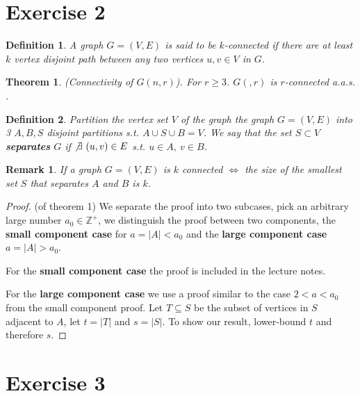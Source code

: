 \documentclass[11pt]{article}
\newtheorem{theorem}{Theorem}
\newtheorem{definition}{Definition}
\newtheorem{remark}{Remark}
\begin{document}
\newpage

\section*{Exercise 2} 

\begin{definition}
    A graph $G=(V,E)$ is said to be $k$-connected if there are at least $k$ vertex disjoint path between any two vertices $u,v\in V$ in $G$.
\end{definition}

\begin{theorem}
    (Connectivity of $G(n,r)$). For $r\geq 3$. $G(,r)$ is $r$-connected a.a.s. .
\end{theorem}

\begin{definition}
    Partition the vertex set $V$ of the graph the graph $G=(V,E)$ into 3 $A,B,S$ disjoint partitions s.t. $A\cup S \cup B=V$. We say that the set $S\subset V$ \textbf{separates} $G$ if $\not \exists ~ (u,v) \in E$ s.t. $u\in A,~v\in B$. 
\end{definition}

\begin{remark}
    If a graph $G=(V,E)$ is $k$ connected $\iff$ the size of the smallest set $S$ that separates $A$ and $B$ is $k$.
\end{remark}

\begin{proof} (of theorem 1)
    We separate the proof into two subcases, pick an arbitrary large number $a_0 \in \mathbb{Z}^+$, we distinguish the proof between two components, the \textbf{small component case} for $a=|A|<a_0$ and the \textbf{large component case} $a=|A|>a_0$.
    \linebreak

    For the \textbf{small component case} the proof is included in the lecture notes.
    \linebreak

    For the \textbf{large component case} we use a proof similar to the case $2<a<a_0$ from the small component proof. Let $T\subseteq S$ be the subset of vertices in $S$ adjacent to $A$, let $t=|T|$ and $s=|S|$. To show our result, lower-bound $t$ and therefore $s$.
\end{proof}

\newpage

\section*{Exercise 3}
\end{document}
